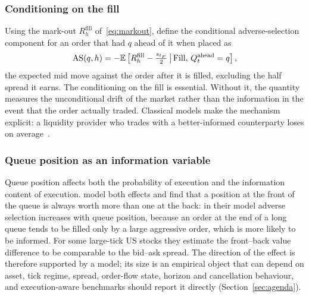 \subsubsection{Conditioning on the fill}

Using the mark-out $R^{\text{fill}}_{h}$ of~\eqref{eq:markout}, define the conditional
adverse-selection component for an order that had $q$ ahead of it when placed as
\begin{equation}
  \mathrm{AS}(q, h) = -\mathbb{E}\left[R^{\text{fill}}_{h} - \tfrac{s_{t_F}}{2} \,\middle|\, \mathrm{Fill},\, Q^{\text{ahead}}_t = q\right],
\end{equation}
the expected mid move against the order after it is filled, excluding the half spread it earns.
The conditioning on the fill is essential. Without it, the quantity measures the unconditional
drift of the market rather than the information in the event that the order actually traded.
Classical models make the mechanism explicit: a liquidity provider who trades with a better-informed
counterparty loses on average~\citep{glosten1985,kyle1985}.

\subsubsection{Queue position as an information variable}

Queue position affects both the probability of execution and the information content of
execution. \citet{moallemi2017} model both effects and find that a position at the front of the
queue is always worth more than one at the back: in their model adverse selection increases with queue
position, because an order at the end of a long queue tends to be filled only by a large aggressive
order, which is more likely to be informed. For some large-tick US stocks they estimate the front--back
value difference to be comparable to the bid--ask spread. The direction of the effect is therefore
supported by a model; its size is an empirical object that can depend on asset, tick regime,
spread, order-flow state, horizon and cancellation behaviour, and execution-aware benchmarks should
report it directly (Section~\ref{sec:agenda}).

